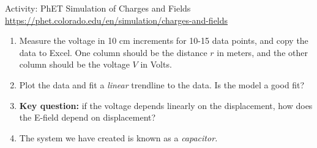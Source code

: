 \documentclass{beamer}
\begin{document}
\begin{frame}{Activity: PhET Simulation of Charges and Fields}
\small
\url{https://phet.colorado.edu/en/simulation/charges-and-fields} \\
\begin{enumerate}
\item Measure the voltage in 10 cm increments for 10-15 data points, and copy the data to Excel.  One column should be the distance $r$ in meters, and the other column should be the voltage $V$ in Volts.
\item Plot the data and fit a \textit{linear} trendline to the data.  Is the model a good fit?
\item \textbf{\alert{Key question:}} if the voltage depends linearly on the displacement, how does the E-field depend on displacement?
\item The system we have created is known as a \textit{capacitor.}
\end{enumerate}
\end{frame}
\end{document}
